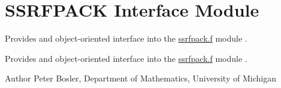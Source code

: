 \hypertarget{group___s_s_r_f_p_a_c_k_interface}{\section{S\+S\+R\+F\+P\+A\+C\+K Interface Module}
\label{group___s_s_r_f_p_a_c_k_interface}
}


Provides and object-\/oriented interface into the \hyperlink{ssrfpack_8f_source}{ssrfpack.\+f} module \cite{SSRFPACK} .  


Provides and object-\/oriented interface into the \hyperlink{ssrfpack_8f_source}{ssrfpack.\+f} module \cite{SSRFPACK} . 

\begin{DoxyAuthor}{Author}
Peter Bosler, Department of Mathematics, University of Michigan 
\end{DoxyAuthor}
